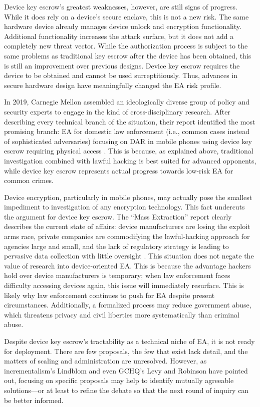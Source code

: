 \documentclass{IEEEtran}
\begin{document}
Device key escrow's greatest weaknesses, however, are still signs of progress. While it does rely on a device's secure
enclave, this is not a new risk. The same hardware device already manages device unlock and encryption functionality.
Additional functionality increases the attack surface, but it does not add a completely new threat vector. While the
authorization process is subject to the same problems as traditional key escrow after the device has been obtained, this
is still an improvement over previous designs. Device key escrow requires the device to be obtained and cannot be used
surreptitiously. Thus, advances in secure hardware design have meaningfully changed the \ac{EA} risk profile.

In 2019, Carnegie Mellon assembled an ideologically diverse group of policy and security experts to engage in the kind
of cross-disciplinary research. After describing every technical branch of the situation, their report identified the
most promising branch: \ac{EA} for domestic law enforcement (i.e., common cases instead of sophisticated adversaries)
focusing on \ac{DAR} in mobile phones using device key escrow requiring physical access \cite{group_2019}. This is
because, as explained above, traditional investigation combined with lawful hacking is best suited for advanced
opponents, while device key escrow represents actual progress towards low-risk \ac{EA} for common crimes.

Device encryption, particularly in mobile phones, may actually pose the smallest impediment to investigation of any
encryption technology. This fact undercuts the argument for device key escrow. The ``Mass Extraction'' report clearly
describes the current state of affairs: device manufacturers are losing the exploit arms race, private companies are
commodifying the \ac{lawful-hacking} approach for agencies large and small, and the lack of regulatory strategy is
leading to pervasive data collection with little oversight \cite{koepke_2020}. 
This situation does not negate the value of research into device-oriented \ac{EA}. This is
because the advantage hackers hold over device manufacturers is temporary; when law enforcement faces difficulty
accessing devices again, this issue will immediately resurface. This is likely why law enforcement continues to push for
\ac{EA} despite present circumstances. Additionally, a formalized process may reduce government abuse, which threatens
privacy and civil liberties more systematically than criminal abuse.


Despite device key escrow's tractability as a technical niche of \ac{EA}, it is not ready for deployment. There are few
proposals, the few that exist lack detail, and the matters of scaling and administration are unresolved. However, as
\ac{incrementalism}'s Lindblom and even \ac{GCHQ}'s Levy and Robinson have pointed out, focusing on specific proposals
may help to identify mutually agreeable solutions---or at least to refine the debate so that the next round of inquiry
can be better informed.
\end{document}
